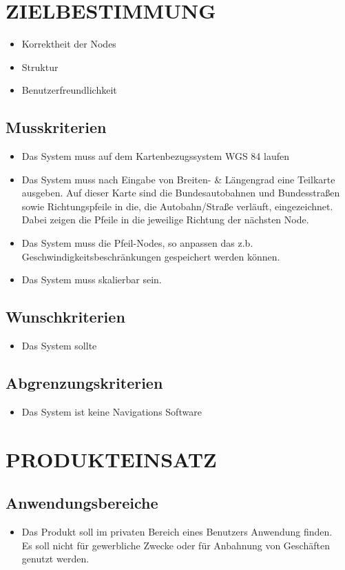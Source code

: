 \newpage
	\section{\Large ZIELBESTIMMUNG}
	\begin{itemize}
		\item Korrektheit der Nodes
		\item Struktur
		\item Benutzerfreundlichkeit
	\end{itemize}
	\subsection{Musskriterien}
	\begin{itemize}
		\item Das System muss auf dem Kartenbezugssystem WGS 84 laufen
		\item Das System muss nach Eingabe von Breiten- \& Längengrad eine Teilkarte ausgeben. Auf dieser Karte sind die Bundesautobahnen und Bundesstraßen sowie Richtungspfeile in die, die Autobahn/Straße verläuft, eingezeichnet. Dabei zeigen die Pfeile in die jeweilige Richtung der nächsten Node.
		\item Das System muss die Pfeil-Nodes, so anpassen das z.b. Geschwindigkeitsbeschränkungen gespeichert werden können. 
		\item Das System muss skalierbar sein.
	\end{itemize}
	\subsection{Wunschkriterien}
	\begin{itemize}
		\item Das System sollte
	\end{itemize}
	\subsection{Abgrenzungskriterien}
	\begin{itemize}
		\item Das System ist keine Navigations Software
	\end{itemize}
	
	\section{\Large PRODUKTEINSATZ}
	\subsection{Anwendungsbereiche}
	\begin{itemize}
		\item Das Produkt soll im privaten Bereich eines Benutzers Anwendung finden.\\
		Es soll nicht für gewerbliche Zwecke oder für Anbahnung von Geschäften genutzt werden.
	\end{itemize}
